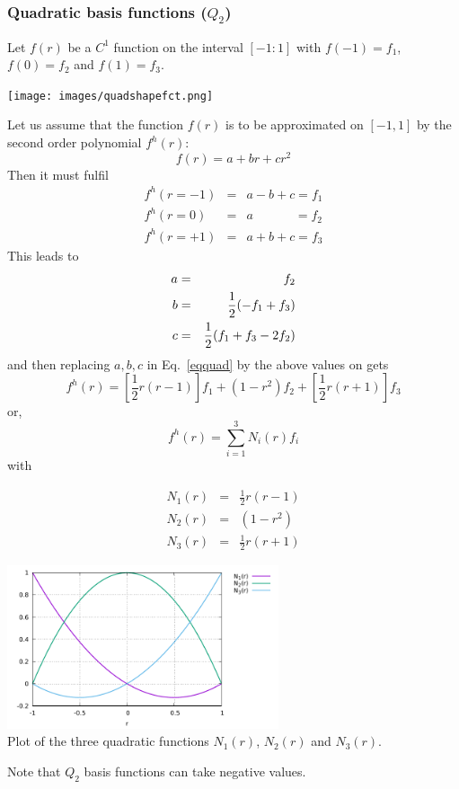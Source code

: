 \newpage
\subsubsection{Quadratic basis functions ($Q_2$) \label{sec:bf2}}

Let $f(r)$ be a $C^1$ function on the interval $[-1:1]$ with $f(-1)=f_1$, $f(0)=f_2$ and $f(1)=f_3$.
\begin{center}
\texttt{[image: images/quadshapefct.png]}
\end{center}
Let us assume that the function $f(r)$ is to be approximated on $[-1,1]$ by the second order polynomial 
$f^h(r)$:
\begin{equation}
f(r)=a+br+cr^2 \label{eqquad}
\end{equation}
Then it must fulfil
\begin{eqnarray}
f^h(r=-1)&=&a-b+c = f_1 \nonumber\\
f^h(r=0) &=&a\quad\quad\quad\;     = f_2 \nonumber\\
f^h(r=+1)&=&a+b+c = f_3 \nonumber
\end{eqnarray}
This leads to
\begin{eqnarray}
a&=&f_2   \nonumber\\
b&=&\frac{1}{2}(-f_1+f_3)  \nonumber\\
c&=&\frac{1}{2}(f_1+f_3-2f_2) 
\end{eqnarray}
and then replacing $a,b,c$ in Eq.~\eqref{eqquad} by the above values on gets
\[
f^h(r)=\left[\frac{1}{2}r(r-1)\right] f_1 + (1-r^2) f_2 + \left[\frac{1}{2}r(r+1)\right] f_3
\]
or,
\[
\boxed{
f^h(r) = \sum_{i=1}^3 N_i(r) f_i
}
\]
with
\begin{mdframed}[backgroundcolor=blue!5]
\begin{eqnarray}
N_1(r) &=& \frac{1}{2}r(r-1) \nonumber\\
N_2(r) &=& (1-r^2) \nonumber\\ 
N_3(r) &=& \frac{1}{2}r(r+1) 
\end{eqnarray}
\end{mdframed}

\begin{center}
\includegraphics[width=8cm]{images/basis1D/quadratic.pdf}\\
{\captionfont Plot of the three quadratic functions $N_1(r)$, $N_2(r)$ and $N_3(r)$.}
\end{center}
Note that $Q_2$ basis functions can take negative values. 

